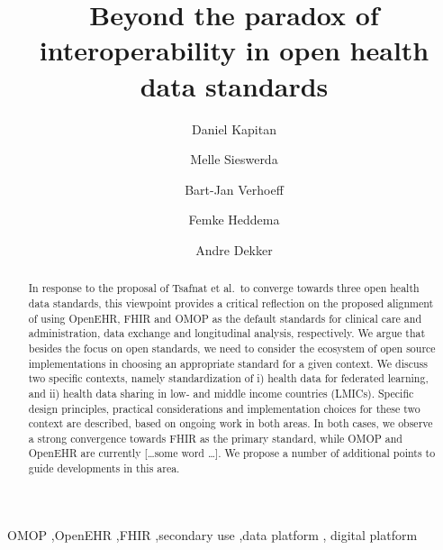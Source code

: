 \documentclass[
  authoryear]{elsarticle}
\begin{document}
\begin{frontmatter}
\title{Beyond the paradox of interoperability in open health data
standards}
\author[1,2,3]{Daniel Kapitan%
%
}
\author[4,5]{Melle Sieswerda%
%
}

\author[6]{Bart-Jan Verhoeff%
%
}

\author[2]{Femke Heddema%
%
}

\author[5]{Andre Dekker%
%
}








        
\begin{abstract}
In response to the proposal of Tsafnat et al.~to converge towards three
open health data standards, this viewpoint provides a critical
reflection on the proposed alignment of using OpenEHR, FHIR and OMOP as
the default standards for clinical care and administration, data
exchange and longitudinal analysis, respectively. We argue that besides
the focus on open standards, we need to consider the ecosystem of open
source implementations in choosing an appropriate standard for a given
context. We discuss two specific contexts, namely standardization of i)
health data for federated learning, and ii) health data sharing in low-
and middle income countries (LMICs). Specific design principles,
practical considerations and implementation choices for these two
context are described, based on ongoing work in both areas. In both
cases, we observe a strong convergence towards FHIR as the primary
standard, while OMOP and OpenEHR are currently {[}\ldots some word
\ldots{]}. We propose a number of additional points to guide
developments in this area.
\end{abstract}





\begin{keyword}
    OMOP \sep OpenEHR \sep FHIR \sep secondary use \sep data
platform \sep 
    digital platform
\end{keyword}
\end{frontmatter}
    
\end{document}

